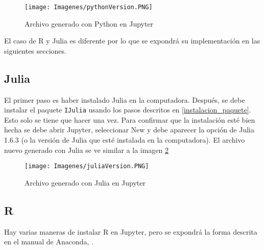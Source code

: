 \begin{figure}[h]
	\begin{center}
		\texttt{[image: Imagenes/pythonVersion.PNG]}
		\caption{Archivo generado con Python en Jupyter}
		\label{pythonVersion}
	\end{center}
\end{figure}

El caso de \textsf{R} y \textsf{Julia} es diferente por lo que se expondrá su implementación en las siguientes secciones. 

\subsection{Julia}

El primer paso es haber instalado \textsf{Julia} en la computadora. Después, se debe instalar el paquete \texttt{IJulia} usando los pasos descritos en \ref{instalacion_paquete}. Esto solo se tiene que hacer una vez. Para confirmar que la instalación esté bien hecha se debe abrir \textsf{Jupyter}, seleccionar \textsf{New} y debe aparecer la opción de \textsf{Julia 1.6.3} (o la versión de \textsf{Julia} que esté instalada en la computadora). El archivo nuevo generado con \textsf{Julia} se ve similar a la imagen \ref{juliaVersion_ss}

\begin{figure}[h]
	\begin{center}
		\texttt{[image: Imagenes/juliaVersion.PNG]}
		\caption{Archivo generado con Julia en Jupyter}
		\label{juliaVersion_ss}
	\end{center}
\end{figure}

\subsection{R}

Hay varias maneras de instalar \textsf{R} en \textsf{Jupyter}, pero se expondrá la forma descrita en el manual de \textsf{Anaconda}, \cite{anaconda_doc}. 

